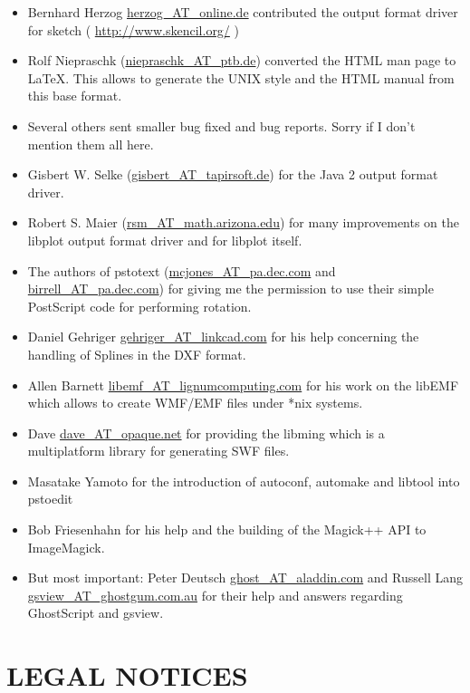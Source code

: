\documentclass[english,a4paper]{article}
\let\URL\url \let\Email\url \let\File\url
\begin{document}
\begin{itemize}
  \item Bernhard Herzog \Email{herzog_AT_online.de} contributed the output format driver for
     sketch ( \URL{http://www.skencil.org/} )

  \item Rolf Niepraschk (\Email{niepraschk_AT_ptb.de}) converted the HTML man page
     to LaTeX. This allows to generate the UNIX style and the HTML manual from this
     base format.

  \item Several others sent smaller bug fixed and bug reports. Sorry if I don't
     mention them all here.

  \item Gisbert W. Selke (\Email{gisbert_AT_tapirsoft.de}) for the Java 2 output format driver.
     
  \item Robert S. Maier (\Email{rsm_AT_math.arizona.edu}) for many improvements on
	the libplot output format driver and for libplot itself.
  \item The authors of pstotext (\Email{mcjones_AT_pa.dec.com} and \Email{birrell_AT_pa.dec.com}) 
	for giving me the permission to use their simple PostScript code for 
	performing rotation.
  \item  Daniel Gehriger \Email{gehriger_AT_linkcad.com} for his help concerning the handling of Splines in the DXF format. 
  \item Allen Barnett \Email{libemf_AT_lignumcomputing.com} for his work on the libEMF which allows to create WMF/EMF files under *nix systems.
  \item Dave \Email{dave_AT_opaque.net} for providing the libming which is a multiplatform library for generating SWF files.
  \item Masatake Yamoto for the introduction of autoconf, automake and libtool into pstoedit
  \item Bob Friesenhahn for his help and the building of the Magick++ API to ImageMagick.
  \item But most important: Peter Deutsch \Email{ghost_AT_aladdin.com} and Russell
     Lang \Email{gsview_AT_ghostgum.com.au} for their help and answers regarding
     GhostScript and gsview.

\end{itemize}

\section{LEGAL NOTICES}
\end{document}
